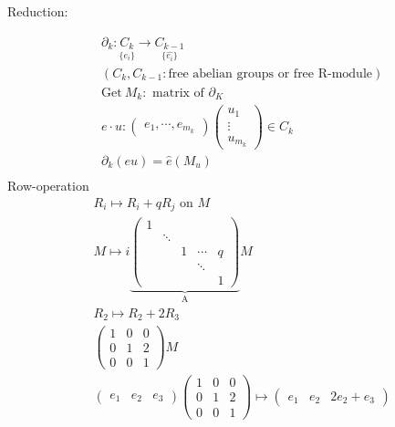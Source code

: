 \documentclass[11pt,a4paper]{report}
\begin{document}
              Reduction: 
              
              \begin{align*}
                &\partial_k: \underset{\{e_i\}}{C_k} \rightarrow \underset{\{\hat{e_i}\}}{C_{k-1}}\\
                &(C_{k}, C_{k-1}: \textrm{free abelian groups or free R-module})\\
                &\textrm{Get} \ M_k: \textrm{ matrix of } \partial_K\\
                &e \cdot u: {\begin{pmatrix}e_1, \cdots, e_{m_k}\end{pmatrix}}{\begin{pmatrix}u_1\\\vdots\\u_{m_k}\end{pmatrix}} \in C_k\\
                &\partial_k(eu) = \hat{e}(M_u)\\
              \end{align*}
              Row-operation
              \begin{align*}
                &R_i \mapsto R_i + qR_j \textrm{ on } M\\
                &M \mapsto i\underbrace{\begin{pmatrix}1&&&& \\ & \ddots &&& \\ && 1 & \cdots & q \\ &&& \ddots & \\ &&&& 1 \end{pmatrix}}_\text{A} M\\
                &R_2 \mapsto R_2 + 2R_3\\
                &\begin{pmatrix}1&0&0\\0&1&2\\0&0&1\end{pmatrix} M\\
                &\begin{pmatrix}e_1 & e_2 & e_3\end{pmatrix}\begin{pmatrix}1&0&0\\0&1&2\\0&0&1\end{pmatrix} \mapsto \begin{pmatrix}e_1 & e_2 & 2e_2 + e_3\end{pmatrix}
              \end{align*}
\end{document}
